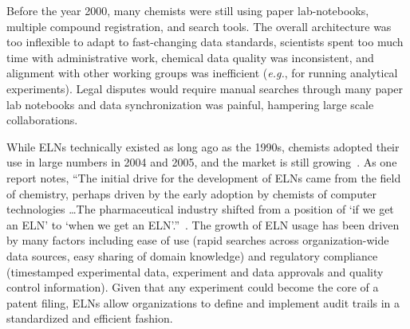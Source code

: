 \documentclass{sig-alternate}
\begin{document}
Before the year 2000, many chemists were still using paper
lab-notebooks, multiple compound registration, and search
tools. The overall architecture was too inflexible to
adapt to fast-changing data standards, scientists spent too much time
with administrative work, chemical data quality was inconsistent, and
alignment with other working groups was inefficient (\emph{e.g.}, for
running analytical experiments). Legal disputes would require manual
searches through many paper lab notebooks and data synchronization was
painful, hampering large scale collaborations.


While ELNs technically existed as long ago as the 1990s, chemists
adopted their use in large numbers in 2004 and 2005, and the market is
still growing~\cite{ELNstatus}. As one report notes, ``The initial
drive for the development of ELNs came from the field of chemistry,
perhaps driven by the early adoption by chemists of computer
technologies \ldots The pharmaceutical industry shifted from a
position of `if we get an ELN' to `when we get an
ELN'.''~\cite{ELNstatus}. The growth of ELN usage has been
driven by many factors including ease of use (rapid searches across
organization-wide data sources, easy sharing of domain knowledge) and
regulatory compliance (timestamped experimental data, experiment and
data approvals and quality control information). Given that any experiment could
become the core of a patent filing, ELNs allow organizations to define
and implement audit trails in a standardized and efficient fashion.
\end{document}
